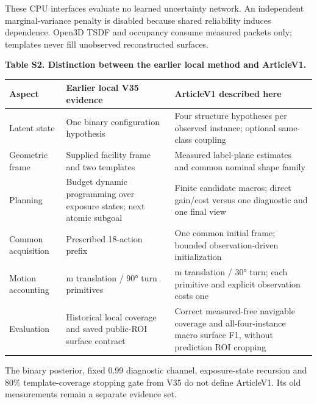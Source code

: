 \documentclass[11pt,a4paper]{article}
\newlength{\SupplementTableWidth}
\begin{document}
These CPU interfaces evaluate no learned uncertainty network. An independent marginal-variance penalty is disabled because shared reliability induces dependence. Open3D TSDF and occupancy consume measured packets only; templates never fill unobserved reconstructed surfaces.

\par\noindent\begin{minipage}{\linewidth}
\small\textbf{Table S2. Distinction between the earlier local method and ArticleV1.}\par\medskip
\centering
\setlength{\tabcolsep}{4pt}
\renewcommand{\arraystretch}{1.13}
\setlength{\SupplementTableWidth}{\dimexpr\linewidth-4\tabcolsep\relax}
\begin{tabular}{@{}>{\raggedright\arraybackslash}p{0.2\SupplementTableWidth} >{\raggedright\arraybackslash}p{0.38\SupplementTableWidth} >{\raggedright\arraybackslash}p{0.42\SupplementTableWidth}@{}}
\toprule
Aspect & Earlier local V35 evidence & ArticleV1 described here \\
\midrule
Latent state & One binary configuration hypothesis & Four structure hypotheses per observed instance; optional same-class coupling \\
Geometric frame & Supplied facility frame and two templates & Measured label-plane estimates and common nominal shape family \\
Planning & Budget dynamic programming over exposure states; next atomic subgoal & Finite candidate macros; direct gain/cost versus one diagnostic and one final view \\
Common acquisition & Prescribed 18-action prefix & One common initial frame; bounded observation-driven initialization \\
Motion accounting & 1 m translation / 90° turn primitives & 0.25 m translation / 30° turn; each primitive and explicit observation costs one \\
Evaluation & Historical local coverage and saved public-ROI surface contract & Correct measured-free navigable coverage and all-four-instance macro surface F1, without prediction ROI cropping \\
\bottomrule
\end{tabular}
\end{minipage}\par\medskip

The binary posterior, fixed 0.99 diagnostic channel, exposure-state recursion and 80\% template-coverage stopping gate from V35 do not define ArticleV1. Its old measurements remain a separate evidence set.
\end{document}
